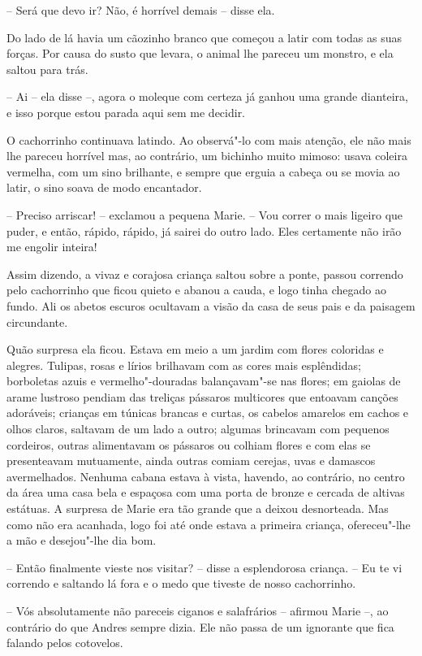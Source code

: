 -- Será que devo ir? Não, é horrível demais -- disse ela.

Do lado de lá havia um cãozinho branco que começou a latir com todas as
suas forças. Por causa do susto que levara, o animal lhe pareceu um
monstro, e ela saltou para trás.

-- Ai -- ela disse --, agora o moleque com certeza já
ganhou uma grande dianteira, e isso porque estou parada aqui sem 
me decidir.

O cachorrinho continuava latindo. Ao observá"-lo com mais atenção, ele
não mais lhe pareceu horrível mas, ao contrário, um bichinho muito
mimoso: usava coleira vermelha, com um sino brilhante, e
sempre que erguia a cabeça ou se movia ao latir, o sino soava de modo
encantador.

-- Preciso arriscar! -- exclamou a pequena Marie. -- Vou
correr o mais ligeiro que puder, e então, rápido, rápido, já sairei do
outro lado. Eles certamente não irão me engolir inteira!

Assim dizendo, a vivaz e corajosa criança saltou sobre a ponte, passou
correndo pelo cachorrinho que ficou quieto e abanou a cauda, e logo
tinha chegado ao fundo. Ali os abetos escuros ocultavam a visão da casa
de seus pais e da paisagem circundante.

Quão surpresa ela ficou. Estava em meio a um jardim com flores coloridas
e alegres. Tulipas, rosas e lírios brilhavam com as cores mais
esplêndidas; borboletas azuis e vermelho"-douradas balançavam"-se nas
flores; em gaiolas de arame lustroso pendiam das treliças pássaros
multicores que entoavam canções adoráveis; crianças em túnicas
brancas e curtas, os cabelos amarelos em cachos e olhos claros,
saltavam de um lado a outro; algumas brincavam com pequenos cordeiros,
outras alimentavam os pássaros ou colhiam flores e com elas se
presenteavam mutuamente, ainda outras comiam cerejas, uvas e damascos
avermelhados. Nenhuma cabana estava à vista, havendo, ao contrário, no
centro da área uma casa bela e espaçosa com uma porta de bronze e
cercada de altivas estátuas. A surpresa de Marie era tão grande que a
deixou desnorteada. Mas como não era acanhada, logo foi até onde estava
a primeira criança, ofereceu"-lhe a mão e desejou"-lhe dia bom. 

-- Então finalmente vieste nos visitar? -- disse a
esplendorosa criança. -- Eu te vi correndo e saltando lá fora e o
medo que tiveste de nosso cachorrinho.

-- Vós absolutamente não pareceis ciganos e salafrários -- 
afirmou Marie --, ao contrário do que Andres sempre dizia. 
Ele não passa de um ignorante que fica falando pelos cotovelos.

